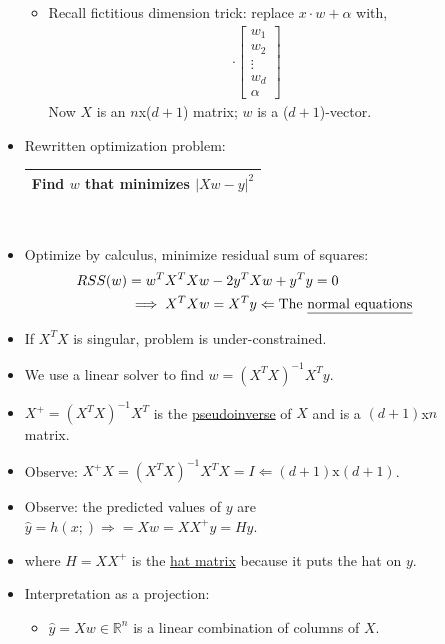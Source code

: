 \documentclass[10pt]{article}
\begin{document}
\begin{description}
\begin{itemize}
\begin{itemize}
				\item Recall fictitious dimension trick: replace $x\cdot w + \alpha$ with,
					\begin{align*}
						[x_{1} \ x_{2} \ \dots \ x_{d} \ 1] \cdot \begin{bmatrix}
								w_{1}\\
								w_{2}\\
								\vdots\\
								w_{d}\\
								\alpha
							\end{bmatrix}
					\end{align*}
					Now $X$ is an $n$x($d+1$) matrix; $w$ is a ($d+1$)-vector.
				\end{itemize}
			
			\item Rewritten optimization problem:
				\begin{center}
					\begin{tabular}{|c|}
						\hline
						Find $w$ that minimizes $|Xw-y|^{2}$\\
						\hline
					\end{tabular}\\
				\end{center}
			\item Optimize by calculus, minimize residual sum of squares:
				\begin{align*}
					RSS(w) &= w^{T}X^{T}Xw - 2y^{T}Xw + y^{T}y = 0\\
						&\implies X^{T}Xw = X^{T}y \Leftarrow \text{The \underline{normal equations}}
				\end{align*}
			\item If $X^{T}X$ is singular, problem is under-constrained.
			\item We use a linear solver to find $w = (X^{T}X)^{-1}X^{T}y$.
			\item $X^{+} = (X^{T}X)^{-1}X^{T}$ is the \underline{pseudoinverse} of $X$ and is a $(d+1)$x$n$ matrix.
			\item Observe: $X^{+}X = (X^{T}X)^{-1}X^{T}X = I \Leftarrow (d+1)\text{x}(d+1)$.
			\item Observe: the predicted values of $y$ are $\hat{y} = h(x;) \Rightarrow = Xw = XX^{+}y = Hy$.
			\item where $H = XX^{+}$ is the \underline{hat matrix} because it puts the hat on $y$.
			\item Interpretation as a projection:
				\begin{itemize}
					\item $\hat{y} = Xw \in \mathbb{R}^{n}$ is a linear combination of columns of $X$.

\end{itemize}
\end{itemize}
\end{description}
\end{document}
